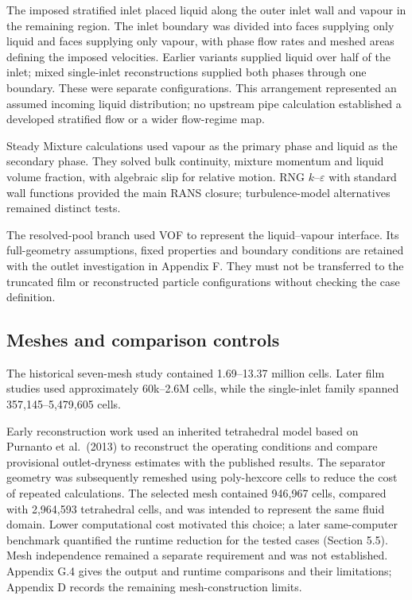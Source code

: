 The imposed stratified inlet placed liquid along the outer inlet wall and vapour in the remaining region. The inlet boundary was divided into faces supplying only liquid and faces supplying only vapour, with phase flow rates and meshed areas defining the imposed velocities. Earlier variants supplied liquid over half of the inlet; mixed single-inlet reconstructions supplied both phases through one boundary. These were separate configurations. This arrangement represented an assumed incoming liquid distribution; no upstream pipe calculation established a developed stratified flow or a wider flow-regime map.

Steady Mixture calculations used vapour as the primary phase and liquid as the secondary phase. They solved bulk continuity, mixture momentum and liquid volume fraction, with algebraic slip for relative motion. RNG \(k\)--\(\varepsilon\) with standard wall functions provided the main RANS closure; turbulence-model alternatives remained distinct tests.

The resolved-pool branch used VOF to represent the liquid--vapour interface. Its full-geometry assumptions, fixed properties and boundary conditions are retained with the outlet investigation in Appendix F. They must not be transferred to the truncated film or reconstructed particle configurations without checking the case definition.

\subsection{Meshes and comparison controls}

The historical seven-mesh study contained 1.69--13.37 million cells. Later film studies used approximately 60k--2.6M cells, while the single-inlet family spanned 357,145--5,479,605 cells.

Early reconstruction work used an inherited tetrahedral model based on Purnanto et al.~(2013) to reconstruct the operating conditions and compare provisional outlet-dryness estimates with the published results. The separator geometry was subsequently remeshed using poly-hexcore cells to reduce the cost of repeated calculations. The selected mesh contained 946,967 cells, compared with 2,964,593 tetrahedral cells, and was intended to represent the same fluid domain. Lower computational cost motivated this choice; a later same-computer benchmark quantified the runtime reduction for the tested cases (Section 5.5). Mesh independence remained a separate requirement and was not established. Appendix G.4 gives the output and runtime comparisons and their limitations; Appendix D records the remaining mesh-construction limits.

